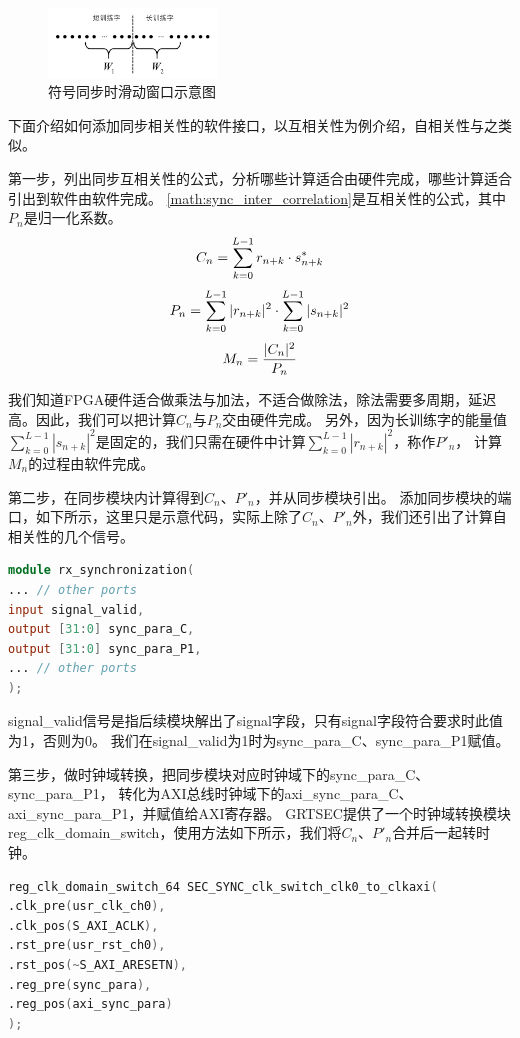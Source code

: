 		\begin{figure}
			\centering
			\includegraphics[width=0.4\textwidth]{img/sync_sliding_window_lts.png}
			\caption{符号同步时滑动窗口示意图}
			\label{fig:sync_sliding_window_lts}
		\end{figure}

	下面介绍如何添加同步相关性的软件接口，以互相关性为例介绍，自相关性与之类似。

	第一步，列出同步互相关性的公式，分析哪些计算适合由硬件完成，哪些计算适合引出到软件由软件完成。
	\ref{math:sync_inter_correlation}是互相关性的公式，其中$P_n$是归一化系数。
		\begin{equation}
			\centering
			C_n = \sum_{k=0}^{L-1} r_{n+k} \cdot s_{n+k}^*
		\end{equation}
		\begin{equation}
			\centering
			P_n = \sum_{k=0}^{L-1} |r_{n+k}|^2 \cdot \sum_{k=0}^{L-1} |s_{n+k}|^2
		\end{equation}
		\begin{equation}
			\centering
			M_n = \frac{|C_n|^2}{P_n}
			\label{math:sync_inter_correlation}
		\end{equation}

	我们知道FPGA硬件适合做乘法与加法，不适合做除法，除法需要多周期，延迟高。因此，我们可以把计算$C_n$与$P_n$交由硬件完成。
	另外，因为长训练字的能量值$\sum_{k=0}^{L-1} |s_{n+k}|^2$是固定的，我们只需在硬件中计算$\sum_{k=0}^{L-1} |r_{n+k}|^2$，称作$P'_n$，
	计算$M_n$的过程由软件完成。

	第二步，在同步模块内计算得到$C_n$、$P'_n$，并从同步模块引出。
	添加同步模块的端口，如下所示，这里只是示意代码，实际上除了$C_n$、$P'_n$外，我们还引出了计算自相关性的几个信号。
	\begin{lstlisting}[language={Verilog}]
module rx_synchronization(
... // other ports
input signal_valid,
output [31:0] sync_para_C,
output [31:0] sync_para_P1,
... // other ports
);
	\end{lstlisting}
	signal\_valid信号是指后续模块解出了signal字段，只有signal字段符合要求时此值为1，否则为0。
	我们在signal\_valid为1时为sync\_para\_C、sync\_para\_P1赋值。

	第三步，做时钟域转换，把同步模块对应时钟域下的sync\_para\_C、sync\_para\_P1，
	转化为AXI总线时钟域下的axi\_sync\_para\_C、axi\_sync\_para\_P1，并赋值给AXI寄存器。
	GRTSEC提供了一个时钟域转换模块reg\_clk\_domain\_switch，使用方法如下所示，我们将$C_n$、$P'_n$合并后一起转时钟。
	\begin{lstlisting}[language={Verilog}]
reg_clk_domain_switch_64 SEC_SYNC_clk_switch_clk0_to_clkaxi(
.clk_pre(usr_clk_ch0),
.clk_pos(S_AXI_ACLK),
.rst_pre(usr_rst_ch0),
.rst_pos(~S_AXI_ARESETN),
.reg_pre(sync_para),
.reg_pos(axi_sync_para)
);
	\end{lstlisting}


